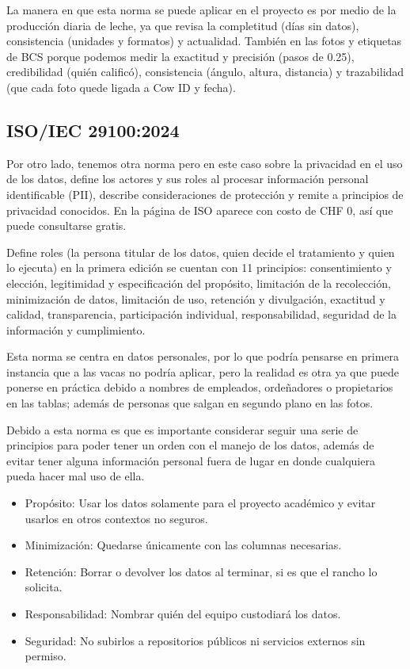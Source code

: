 La manera en que esta norma se puede aplicar en el proyecto es por medio de la producción diaria de leche, ya que revisa la completitud (días sin datos), consistencia (unidades y formatos) y actualidad. También en las fotos y etiquetas de BCS porque podemos medir la exactitud y precisión (pasos de 0.25), credibilidad (quién calificó), consistencia (ángulo, altura, distancia) y trazabilidad (que cada foto quede ligada a Cow ID y fecha).

\subsection{ISO/IEC 29100:2024}

Por otro lado, tenemos otra norma pero en este caso sobre la privacidad en el uso de los datos, define los actores y sus roles al procesar información personal identificable (PII), describe consideraciones de protección y remite a principios de privacidad conocidos. En la página de ISO aparece con costo de CHF 0, así que puede consultarse gratis.

Define roles (la persona titular de los datos, quien decide el tratamiento y quien lo ejecuta) en la primera edición se cuentan con 11 principios: consentimiento y elección, legitimidad y especificación del propósito, limitación de la recolección, minimización de datos, limitación de uso, retención y divulgación, exactitud y calidad, transparencia, participación individual, responsabilidad, seguridad de la información y cumplimiento.

Esta norma se centra en datos personales, por lo que podría pensarse en primera instancia que a las vacas no podría aplicar, pero la realidad es otra ya que puede ponerse en práctica debido a nombres de empleados, ordeñadores o propietarios en las tablas; además de personas que salgan en segundo plano en las fotos.

Debido a esta norma es que es importante considerar seguir una serie de principios para poder tener un orden con el manejo de los datos, además de evitar tener alguna información personal fuera de lugar en donde cualquiera pueda hacer mal uso de ella.

\begin{itemize}
  \item Propósito: Usar los datos solamente para el proyecto académico y evitar usarlos en otros contextos no seguros.
  \item Minimización: Quedarse únicamente con las columnas necesarias.
  \item Retención: Borrar o devolver los datos al terminar, si es que el rancho lo solicita.
  \item Responsabilidad: Nombrar quién del equipo custodiará los datos.
  \item Seguridad: No subirlos a repositorios públicos ni servicios externos sin permiso.
\end{itemize}


